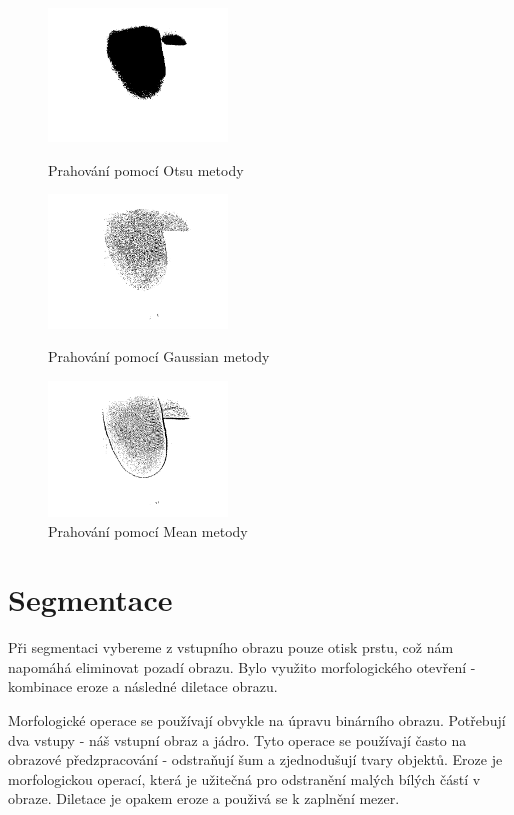 \begin{figure}[!htbp]
  \begin{minipage}[b]{0.3\linewidth}
    \centering
    \includegraphics[width=180px]{obrazky-figures/live25otsu.png}
    \caption{Prahování pomocí Otsu metody}
  \end{minipage}
  \hspace{0.3cm}
  \begin{minipage}[b]{0.3\linewidth}
    \centering
    \includegraphics[width=180px]{obrazky-figures/live25gauss.png}
    \caption{Prahování pomocí Gaussian metody}
  \end{minipage}
  \hspace{0.3cm}
    \begin{minipage}[b]{0.3\linewidth}
    \centering
    \includegraphics[width=180px]{obrazky-figures/live25mean.png}
    \caption{Prahování pomocí Mean metody}
  \end{minipage}
\end{figure}
\section{Segmentace}
Při segmentaci vybereme z vstupního obrazu pouze otisk prstu, což nám napomáhá eliminovat pozadí obrazu. Bylo využito morfologického otevření - kombinace eroze a následné diletace obrazu.

Morfologické operace se používají obvykle na úpravu binárního obrazu. Potřebují dva vstupy - náš vstupní obraz a jádro.\cite{OpenCVMorphology} Tyto operace se používají často na obrazové předzpracování - odstraňují šum a zjednodušují tvary objektů. Eroze je morfologickou operací, která je užitečná pro odstranění malých bílých částí v obraze. Diletace je opakem eroze a použivá se k zaplnění mezer.\cite{ExerciseMorphology}

